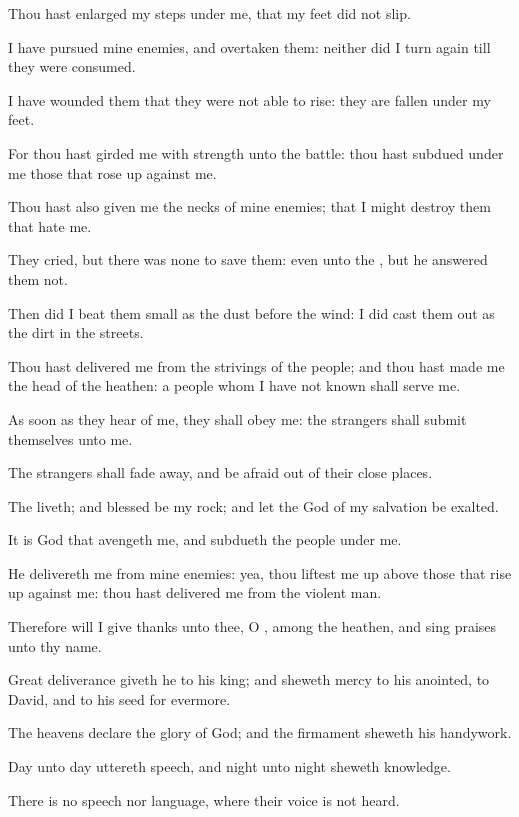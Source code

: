 \Verse Thou hast enlarged my steps under me, that my feet did not slip.

\Verse I have pursued mine enemies, and overtaken them: neither did I turn again till they were consumed.

\Verse I have wounded them that they were not able to rise: they are fallen under my feet.

\Verse For thou hast girded me with strength unto the battle: thou hast subdued under me those that rose up against me.

\Verse Thou hast also given me the necks of mine enemies; that I might destroy them that hate me.

\Verse They cried, but there was none to save them: even unto the \LORD, but he answered them not.

\Verse Then did I beat them small as the dust before the wind: I did cast them out as the dirt in the streets.

\Verse Thou hast delivered me from the strivings of the people; and thou hast made me the head of the heathen: a people whom I have not known shall serve me.

\Verse As soon as they hear of me, they shall obey me: the strangers shall submit themselves unto me.

\Verse The strangers shall fade away, and be afraid out of their close places.

\Verse The \LORD liveth; and blessed be my rock; and let the God of my salvation be exalted.

\Verse It is God that avengeth me, and subdueth the people under me.

\Verse He delivereth me from mine enemies: yea, thou liftest me up above those that rise up against me: thou hast delivered me from the violent man.

\Verse Therefore will I give thanks unto thee, O \LORD, among the heathen, and sing praises unto thy name.

\Verse Great deliverance giveth he to his king; and sheweth mercy to his anointed, to David, and to his seed for evermore.




\Chapter
\Verse The heavens declare the glory of God; and the firmament sheweth his handywork.

\Verse Day unto day uttereth speech, and night unto night sheweth knowledge.

\Verse There is no speech nor language, where their voice is not heard.

